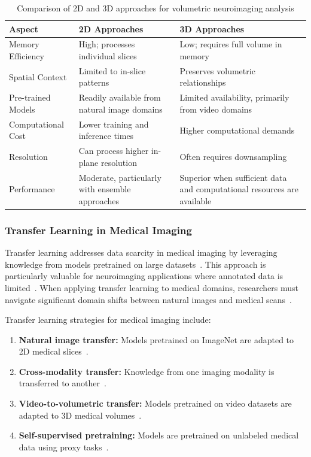 \documentclass[12pt, a4paper]{article}
\begin{document}
\begin{table}[htbp]
\centering
\begin{tabular}{|p{3cm}|p{6cm}|p{6cm}|}
\hline
\textbf{Aspect} & \textbf{2D Approaches} & \textbf{3D Approaches} \\
\hline
Memory Efficiency & High; processes individual slices & Low; requires full volume in memory \\
\hline
Spatial Context & Limited to in-slice patterns & Preserves volumetric relationships \\
\hline
Pre-trained Models & Readily available from natural image domains & Limited availability, primarily from video domains \\
\hline
Computational Cost & Lower training and inference times & Higher computational demands \\
\hline
Resolution & Can process higher in-plane resolution & Often requires downsampling \\
\hline
Performance & Moderate, particularly with ensemble approaches & Superior when sufficient data and computational resources are available \\
\hline
\end{tabular}
\caption{Comparison of 2D and 3D approaches for volumetric neuroimaging analysis}
\label{tab:2d_vs_3d}
\end{table}

\subsubsection{Transfer Learning in Medical Imaging}

Transfer learning addresses data scarcity in medical imaging by leveraging knowledge from models pretrained on large datasets~\cite{hon2017towards}. This approach is particularly valuable for neuroimaging applications where annotated data is limited~\cite{ebrahimi2019transfer}. When applying transfer learning to medical domains, researchers must navigate significant domain shifts between natural images and medical scans~\cite{mehmood2021transfer}.

Transfer learning strategies for medical imaging include:
\begin{enumerate}
\item \textbf{Natural image transfer:} Models pretrained on ImageNet are adapted to 2D medical slices~\cite{maqsood2019transfer}.
\item \textbf{Cross-modality transfer:} Knowledge from one imaging modality is transferred to another~\cite{yang2020mri, kieselmann2021cross}.
\item \textbf{Video-to-volumetric transfer:} Models pretrained on video datasets are adapted to 3D medical volumes~\cite{wu20223d}.
\item \textbf{Self-supervised pretraining:} Models are pretrained on unlabeled medical data using proxy tasks~\cite{tang2022self}.
\end{enumerate}
\end{document}
